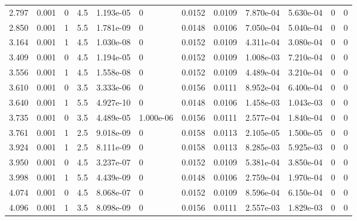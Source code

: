 \documentclass[preview]{standalone}
\begin{document}
{{\begin{tabular}{L{1.2cm}C{1.2cm} C{0.3cm}C{0.5cm} C{1.4cm}C{1.4cm} C{1.4cm}C{1.4cm} C{1.6cm}C{1.6cm} C{1.6cm}C{1.6cm}}
  2.797  &  0.001  & 0     & 4.5 &  1.193e-05  & 0  &  0.0152&   0.0109& 7.870e-04 & 5.630e-04   &  0 & 0  \\ 
  2.850  &  0.001  & 1     & 5.5 &  1.781e-09  & 0  &  0.0148&   0.0106& 7.050e-04 & 5.040e-04   &  0 & 0  \\ 
  3.164  &  0.001  & 1     & 4.5 &  1.030e-08  & 0  &  0.0152&   0.0109& 4.311e-04 & 3.080e-04   &  0 & 0  \\ 
  3.409  &  0.001  & 0     & 4.5 &  1.194e-05  & 0  &  0.0152&   0.0109& 1.008e-03 & 7.210e-04   &  0 & 0  \\ 
  3.556  &  0.001  & 1     & 4.5 &  1.558e-08  & 0  &  0.0152&   0.0109& 4.489e-04 & 3.210e-04   &  0 & 0  \\ 
  3.610  &  0.001  & 0     & 3.5 &  3.333e-06  & 0  &  0.0156&   0.0111& 8.952e-04 & 6.400e-04   &  0 & 0  \\ 
  3.640  &  0.001  & 1     & 5.5 &  4.927e-10  & 0  &  0.0148&   0.0106& 1.458e-03 & 1.043e-03   &  0 & 0  \\ 
  3.735  &  0.001  & 0     & 3.5 &  4.489e-05  & 1.000e-06  &  0.0156&   0.0111& 2.577e-04 & 1.840e-04   &  0 & 0  \\ 
  3.761  &  0.001  & 1     & 2.5 &  9.018e-09  & 0  &  0.0158&   0.0113& 2.105e-05 & 1.500e-05   &  0 & 0  \\ 
  3.924  &  0.001  & 1     & 2.5 &  8.111e-09  & 0  &  0.0158&   0.0113& 8.285e-03 & 5.925e-03   &  0 & 0  \\ 
  3.950  &  0.001  & 0     & 4.5 &  3.237e-07  & 0  &  0.0152&   0.0109& 5.381e-04 & 3.850e-04   &  0 & 0  \\ 
  3.998  &  0.001  & 1     & 5.5 &  4.439e-09  & 0  &  0.0148&   0.0106& 2.759e-04 & 1.970e-04   &  0 & 0  \\ 
  4.074  &  0.001  & 0     & 4.5 &  8.068e-07  & 0  &  0.0152&   0.0109& 8.596e-04 & 6.150e-04   &  0 & 0  \\ 
  4.096  &  0.001  & 1     & 3.5 &  8.098e-09  & 0  &  0.0156&   0.0111& 2.557e-03 & 1.829e-03   &  0 & 0  \\ 
\hline 
\end{tabular} 

}}
\end{document}
